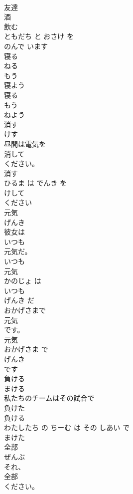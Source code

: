 \documentclass[8pt]{extreport}
\begin{document}
\begin{CJK}{UTF8}{min}
\\	友達 
\\	酒 
\\	飲む 
\\	ともだち と おさけ を 
\\	のんで います
\\	寝る	
\\	ねる	
\\	もう
\\	寝よう
\\	寝る 
\\	もう 
\\	ねよう
\\	消す	
\\	けす	
\\	昼間は電気を
\\	消して
\\	ください。	
\\	消す 
\\	ひるま は でんき を 
\\	けして
\\	ください	
\\	元気	
\\	げんき	
\\	彼女は
\\	いつも
\\	元気だ。	
\\	いつも 
\\	元気 
\\	かのじょ は 
\\	いつも
\\	げんき だ	
\\	おかげさまで
\\	元気
\\	です。	
\\	元気 
\\	おかげさま で 
\\	げんき
\\	です	
\\	負ける	
\\	まける	
\\	私たちのチームはその試合で
\\	負けた
\\	負ける 
\\	わたしたち の ちーむ は その しあい で 
\\	まけた
\\	全部	
\\	ぜんぶ	
\\	それ、
\\	全部
\\	ください。	

\end{CJK}
\end{document}
